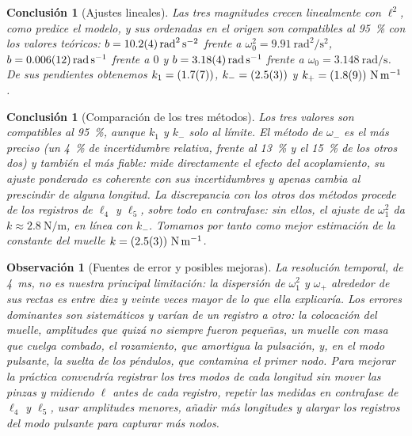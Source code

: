 \documentclass[a4paper,11pt]{amsart}
\numberwithin{equation}{section}
\newcommand{\wz}{\omega_0}                    %
\newcommand{\wu}{\omega_1}                    %
\newcommand{\wm}{\omega_{-}}                  %
\newcommand{\wpl}{\omega_{+}}                 %
\theoremstyle{cienplano}
\newtheorem{conclusion}[proposicion]{Conclusión}
\theoremstyle{ciendef}
\theoremstyle{cienobs}
\newtheorem{observacion}[proposicion]{Observación}
\begin{document}
\begin{conclusion}[Ajustes lineales]\label{conc:ajustes}
Las tres magnitudes crecen linealmente con $\ell^{2}$, como predice el modelo,
y sus ordenadas en el origen son compatibles al \SI{95}{\percent} con los
valores teóricos: $b=\SI{10,2 \pm 0,4}{\radian\squared\per\second\squared}$
frente a $\wz^{2}=\SI{9,91}{\radian\squared\per\second\squared}$,
$b=\SI{0,006 \pm 0,012}{\radian\per\second}$ frente a $0$ y
$b=\SI{3,18 \pm 0,04}{\radian\per\second}$ frente a
$\wz=\SI{3,148}{\radian\per\second}$. De sus pendientes obtenemos
$k_{1}=(\valKUno)$, $k_{-}=(\valKMenos)$ y $k_{+}=(\valKMas)\ \si{\newton\per\meter}$.
\end{conclusion}

\begin{conclusion}[Comparación de los tres métodos]\label{conc:comparacion}
Los tres valores son compatibles al \SI{95}{\percent}, aunque $k_{1}$ y
$k_{-}$ solo al límite. El método de $\wm$ es el más preciso (un
\SI{4}{\percent} de incertidumbre relativa, frente al \SI{13}{\percent} y el
\SI{15}{\percent} de los otros dos) y también el más fiable: mide
directamente el efecto del acoplamiento, su ajuste ponderado es coherente con
sus incertidumbres y apenas cambia al prescindir de alguna longitud. La
discrepancia con los otros dos métodos procede de los registros de $\ell_4$ y
$\ell_5$, sobre todo en contrafase: sin ellos, el ajuste de $\wu^{2}$ da
$k\approx\SI{2,8}{\newton\per\meter}$, en línea con $k_{-}$. Tomamos por tanto
como mejor estimación de la constante del muelle
$k=(\valKMenos)\ \si{\newton\per\meter}$.
\end{conclusion}

\begin{observacion}[Fuentes de error y posibles mejoras]\label{obs:mejoras}
La resolución temporal, de \SI{4}{\milli\second}, no es nuestra principal
limitación: la dispersión de $\wu^{2}$ y $\wpl$ alrededor de sus rectas es
entre diez y veinte veces mayor de lo que ella explicaría. Los errores
dominantes son sistemáticos y varían de un registro a otro: la colocación del
muelle, amplitudes que quizá no siempre fueron pequeñas, un muelle con masa
que cuelga combado, el rozamiento, que amortigua la pulsación, y, en el modo
pulsante, la suelta de los péndulos, que contamina el primer nodo. Para
mejorar la práctica convendría registrar los tres modos de cada longitud sin
mover las pinzas y midiendo $\ell$ antes de cada registro, repetir las medidas
en contrafase de $\ell_4$ y $\ell_5$, usar amplitudes menores, añadir más
longitudes y alargar los registros del modo pulsante para capturar más nodos.
\end{observacion}
\end{document}
